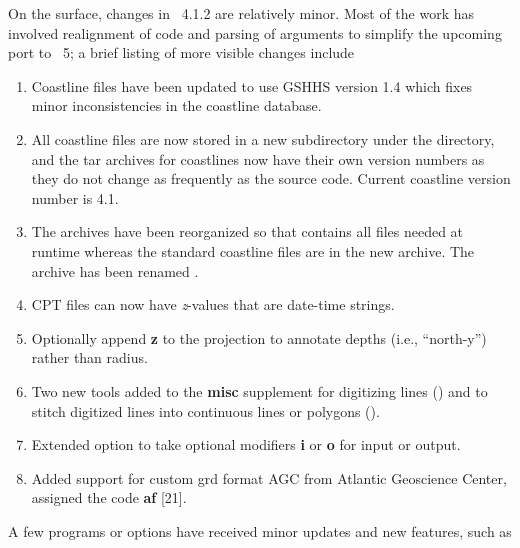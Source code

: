 On the surface, changes in \GMT\ 4.1.2 are relatively minor.  Most of the work has involved
realignment of code and parsing of arguments to simplify the upcoming port to \GMT\ 5;
a brief listing of more visible changes include

\begin{enumerate}
\item Coastline files have been updated to use GSHHS version 1.4 which fixes minor inconsistencies
in the coastline database.
\item All coastline files are now stored in a new subdirectory  under the
 directory, and the tar archives for coastlines now have their own version numbers
as they do not change as frequently as the source code.  Current coastline version number is 4.1.
\item The archives have been reorganized so that  contains all files needed
at runtime whereas the standard coastline files are in the new  archive.
The  archive has been renamed .
\item CPT files can now have {\it z}-values that are date-time strings.
\item Optionally append {\bf z} to the  projection to annotate depths (i.e., ``north-y'') rather than radius.
\item Two new tools added to the {\bf misc} supplement for digitizing lines () and
to stitch digitized lines into continuous lines or polygons ().
\item Extended  option to take optional modifiers {\bf i} or {\bf o} for input or output.
\item Added support for custom grd format AGC from Atlantic Geoscience Center, assigned the code {\bf af} [21].
\end{enumerate}

A few programs or options have received minor updates and new features, such as

